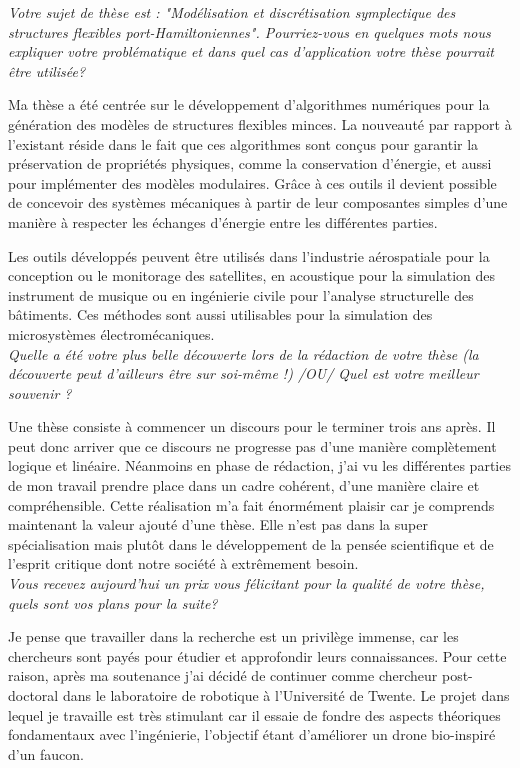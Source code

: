 \documentclass[16pt]{article}
\begin{document}
	\Large
	\textit{Votre sujet de thèse est : "Modélisation et discrétisation
		symplectique des structures flexibles port-Hamiltoniennes". 
		Pourriez-vous en quelques mots nous expliquer votre problématique et dans quel cas d'application votre thèse pourrait être utilisée?
\\}
	
	
	Ma thèse a été centrée sur le développement d'algorithmes numériques pour la génération des modèles de structures flexibles minces. La nouveauté par rapport à l'existant réside dans le fait que ces algorithmes sont conçus pour garantir la préservation de propriétés physiques, comme la conservation d'énergie, et aussi pour implémenter des modèles modulaires. Grâce à ces outils il devient possible de concevoir des systèmes mécaniques à partir de leur composantes simples d'une manière à respecter les échanges d'énergie entre les différentes parties. 
	
	Les outils développés peuvent être utilisés dans l'industrie aérospatiale pour la conception ou le monitorage des satellites, en acoustique pour la simulation des instrument de musique ou en ingénierie civile pour l'analyse structurelle des bâtiments. Ces méthodes sont aussi utilisables pour la simulation des microsystèmes électromécaniques.
\\
	
	\textit{Quelle a été votre plus belle découverte lors de la rédaction de votre thèse (la découverte peut d’ailleurs être sur soi-même !) /OU/ Quel est votre meilleur souvenir ? \\}
	
	 Une thèse consiste à commencer un discours pour le terminer trois ans après. Il peut donc arriver que ce discours ne progresse pas d'une manière complètement logique et linéaire. Néanmoins en phase de rédaction, j'ai vu les différentes parties de mon travail prendre place dans un cadre cohérent, d'une manière claire et compréhensible. Cette réalisation m'a fait énormément plaisir car je comprends maintenant la valeur ajouté d'une thèse. Elle n'est pas dans la super spécialisation mais plutôt dans le développement de la pensée scientifique et de l'esprit critique dont notre société à extrêmement besoin. \\
	 
	\textit{Vous recevez aujourd'hui un prix vous félicitant pour la qualité de votre thèse, quels sont vos plans pour la suite? \\}
	          
	
	Je pense que travailler dans la recherche est un privilège immense, car les chercheurs sont payés pour étudier et approfondir leurs connaissances. Pour cette raison, après ma soutenance j'ai décidé de continuer comme chercheur post-doctoral dans le laboratoire de robotique à l'Université de Twente. Le projet dans lequel je travaille est très stimulant car il essaie de fondre des aspects théoriques fondamentaux avec l'ingénierie, l'objectif étant d'améliorer un drone bio-inspiré d'un faucon. 
	
\end{document}
